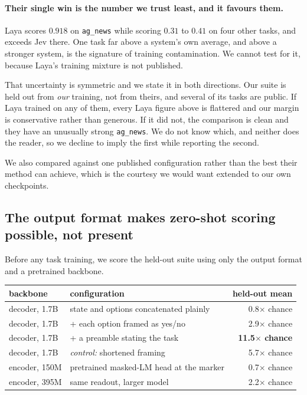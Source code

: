 \paragraph{Their single win is the number we trust least, and it favours
them.} Laya scores $0.918$ on \texttt{ag\_news} while scoring $0.31$ to
$0.41$ on four other tasks, and exceeds Jev there. One task far above a
system's own average, and above a stronger system, is the signature of
training contamination. We cannot test for it, because Laya's training
mixture is not published.

That uncertainty is symmetric and we state it in both directions. Our
suite is held out from \emph{our} training, not from theirs, and several
of its tasks are public. If Laya trained on any of them, every Laya
figure above is flattered and our margin is conservative rather than
generous. If it did not, the comparison is clean and they have an
unusually strong \texttt{ag\_news}. We do not know which, and neither
does the reader, so we decline to imply the first while reporting the
second.

We also compared against one published configuration rather than the best
their method can achieve, which is the courtesy we would want extended to
our own checkpoints.

\subsection{The output format makes zero-shot scoring possible, not
present}
\label{sec:res-architecture}

Before any task training, we score the held-out suite using only the
output format and a pretrained backbone.

\begin{center}
\begin{tabular}{llr}
\toprule
backbone & configuration & held-out mean \\
\midrule
decoder, 1.7B   & state and options concatenated plainly  & 0.8$\times$ chance \\
decoder, 1.7B   & \quad + each option framed as yes/no    & 2.9$\times$ chance \\
decoder, 1.7B   & \quad + a preamble stating the task     & \textbf{11.5$\times$ chance} \\
decoder, 1.7B   & \quad \emph{control:} shortened framing & 5.7$\times$ chance \\
\midrule
encoder, 150M   & pretrained masked-LM head at the marker & 0.7$\times$ chance \\
encoder, 395M   & same readout, larger model              & 2.2$\times$ chance \\
\bottomrule
\end{tabular}
\end{center}

